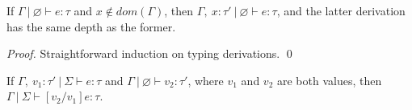 \documentclass{llncs}
\begin{document}
\begin{lemma}[Weakening]
If $\Gamma~|~\varnothing \vdash e : \tau$ and $x \not\in dom(\Gamma)$, then $\Gamma,~x : \tau'~|~\varnothing \vdash e : \tau$, and the latter derivation has the same depth as the former.
\end{lemma}

\begin{proof}
Straightforward induction on typing derivations. \qed
\end{proof}


\begin{lemma}
If $\Gamma,~v_1 : \tau'~|~\Sigma \vdash e : \tau$ and $\Gamma~|~\varnothing \vdash v_2 : \tau'$, where $v_1$ and $v_2$ are both values, then $\Gamma~|~\Sigma \vdash [v_2/v_1]e : \tau$.
\end{lemma}
\end{document}
